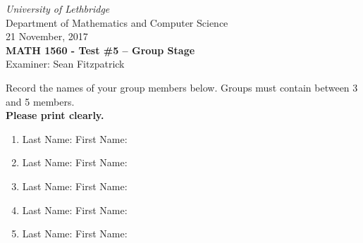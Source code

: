 \documentclass[12pt]{article}
\newcommand{\skipline}{\vspace{12pt}}
\begin{document}
\author{Instructor: Sean Fitzpatrick}
\thispagestyle{plain}
\begin{center}
\emph{University of Lethbridge}\\
Department of Mathematics and Computer Science\\
21 November, 2017\\
{\bf MATH 1560 - Test \#5 -- Group Stage}\\
Examiner: Sean Fitzpatrick
\end{center}

\skipline \skipline \skipline \noindent \skipline

Record the names of your group members below. Groups must contain between 3 and 5 members. \\

\textbf{Please print clearly.}

\skipline

\begin{enumerate}
\item Last Name:\underline{\hspace{200pt}} \quad First Name:\underline{\hspace{140pt}}

\skipline\skipline

\item Last Name:\underline{\hspace{200pt}} \quad First Name:\underline{\hspace{140pt}}

\skipline\skipline

\item Last Name:\underline{\hspace{200pt}} \quad First Name:\underline{\hspace{140pt}}

\skipline\skipline

\item Last Name:\underline{\hspace{200pt}} \quad First Name:\underline{\hspace{140pt}}

\skipline\skipline

\item Last Name:\underline{\hspace{200pt}} \quad First Name:\underline{\hspace{140pt}}

\end{enumerate}
%
\end{document}
